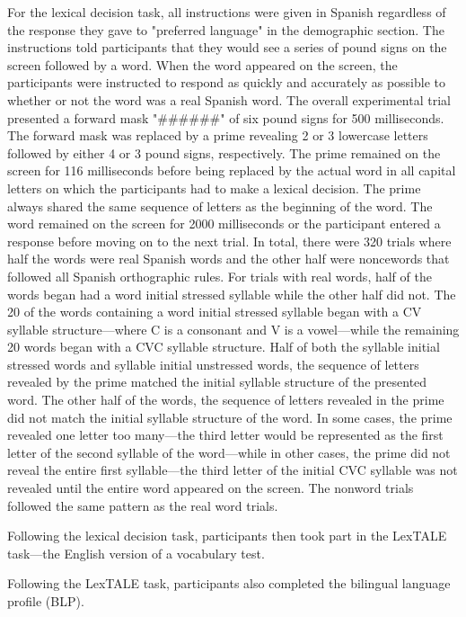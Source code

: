 \documentclass[
12pt, %
english, %
doublespacing, %
nolistspacing, %
liststotoc, %
headsepline, %
chapterinoneline, %
openany, %
]{DoctoralThesis}\usepackage[]{graphicx}\usepackage[]{color}
\begin{document}
For the lexical decision task, all instructions were given in Spanish regardless of the response they gave to "preferred language" in the demographic section. The instructions told participants that they would see a series of pound signs on the screen followed by a word. When the word appeared on the screen, the participants were instructed to respond as quickly and accurately as possible to whether or not the word was a real Spanish word. The overall experimental trial presented a forward mask "\#\#\#\#\#\#" of six pound signs for 500 milliseconds. The forward mask was replaced by a prime revealing 2 or 3 lowercase letters followed by either 4 or 3 pound signs, respectively. The prime remained on the screen for 116 milliseconds before being replaced by the actual word in all capital letters on which the participants had to make a lexical decision. The prime always shared the same sequence of letters as the beginning of the word. The word remained on the screen for 2000 milliseconds or the participant entered a response before moving on to the next trial. In total, there were 320 trials where half the words were real Spanish words and the other half were noncewords that followed all Spanish orthographic rules. For trials with real words, half of the words began had a word initial stressed syllable while the other half did not. The 20 of the words containing a word initial stressed syllable began with a CV syllable structure---where C is a consonant and V is a vowel---while the remaining 20 words began with a CVC syllable structure. Half of both the syllable initial stressed words and syllable initial unstressed words, the sequence of letters revealed by the prime matched the initial syllable structure of the presented word. The other half of the words, the sequence of letters revealed in the prime did not match the initial syllable structure of the word. In some cases, the prime revealed one letter too many---the third letter would be represented as the first letter of the second syllable of the word---while in other cases, the prime did not reveal the entire first syllable---the third letter of the initial CVC syllable was not revealed until the entire word appeared on the screen. The nonword trials followed the same pattern as the real word trials.

Following the lexical decision task, participants then took part in the LexTALE task---the English version of a vocabulary test.

Following the LexTALE task, participants also completed the bilingual language profile (BLP).
\end{document}

